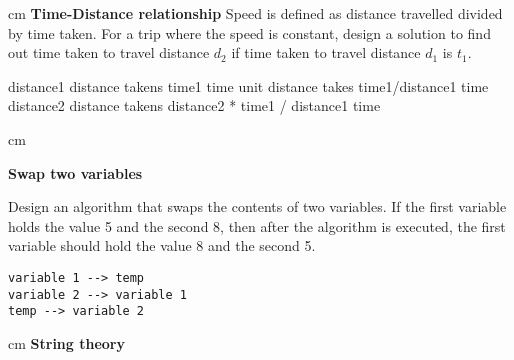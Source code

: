 \vspace{1em}
\begin{questions}

 cm \question  \textbf{Time-Distance relationship} \vskip 0.5cm
Speed is defined as distance travelled divided by time taken. For a trip where the speed is constant, design a solution to find out time taken to travel distance $d_2$ if time taken to travel distance $d_1$ is $t_1$.
\begin{solution}
distance1 distance takens time1 time \newline
unit distance takes time1/distance1 time \newline
distance2 distance takens distance2 * time1 / distance1 time
\end{solution}


 cm 

\question  \textbf{Swap two variables} \vskip 0.5cm

Design an algorithm that swaps the contents of two variables. If the first variable holds the value 5 and the second 8, then after the algorithm is executed, the first variable should hold the value 8 and the second 5.

\begin{solution}
\begin{lstlisting}
variable 1 --> temp
variable 2 --> variable 1
temp --> variable 2
\end{lstlisting}
\end{solution}
%
%
%


 cm \question \textbf{String theory} \vskip 0.5cm


\end{questions}
